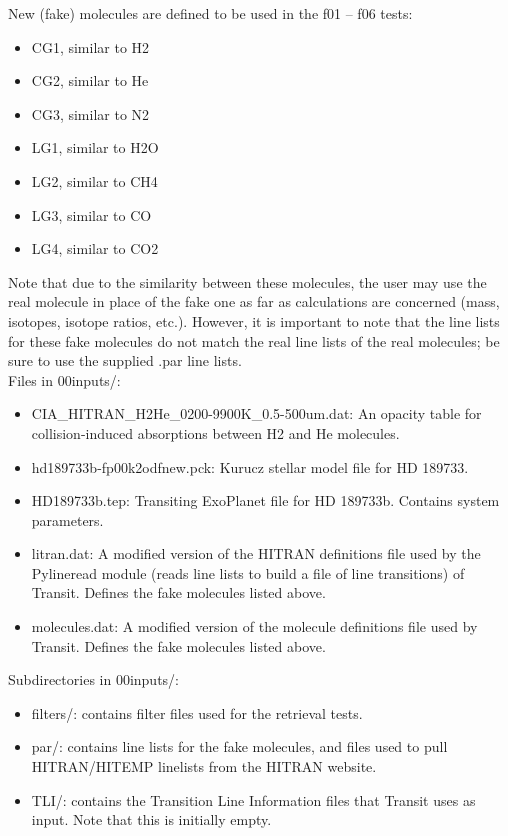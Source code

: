 \documentclass[letterpaper, 12pt]{article}
\begin{document}
New (fake) molecules are defined to be used in the f01 -- f06 tests:
\begin{itemize} \itemsep0pt
  \item CG1, similar to H2
  \item CG2, similar to He
  \item CG3, similar to N2
  \item LG1, similar to H2O
  \item LG2, similar to CH4
  \item LG3, similar to CO
  \item LG4, similar to CO2
\end{itemize}
Note that due to the similarity between these molecules, the user may use 
the real molecule in place of the fake one as far as calculations are 
concerned (mass, isotopes, isotope ratios, etc.). However, it is important to 
note that the line lists for these fake molecules do not match the real line 
lists of the real molecules; be sure to use the supplied .par line lists.\\

Files in 00inputs/:
\begin{itemize} \itemsep0pt
  \item CIA{\_}HITRAN{\_}H2He{\_}0200-9900K{\_}0.5-500um.dat: An opacity table 
        for collision-induced absorptions between H2 and He molecules.
  \item hd189733b-fp00k2odfnew.pck: Kurucz stellar model file for HD 189733.
  \item HD189733b.tep: Transiting ExoPlanet file for HD 189733b. Contains 
        system parameters.
  \item litran.dat: A modified version of the HITRAN definitions file used by 
        the Pylineread module (reads line lists to build a file of line 
        transitions) of Transit. Defines the fake molecules listed above.
  \item molecules.dat: A modified version of the molecule definitions file 
        used by Transit. Defines the fake molecules listed above.
\end{itemize}

Subdirectories in 00inputs/:
\begin{itemize} \itemsep0pt
  \item filters/: contains filter files used for the retrieval tests.
  \item par/: contains line lists for the fake molecules, and files used to pull 
        HITRAN/HITEMP linelists from the HITRAN website.
  \item TLI/: contains the Transition Line Information files that Transit uses 
        as input. Note that this is initially empty.
\end{itemize}
\end{document}
